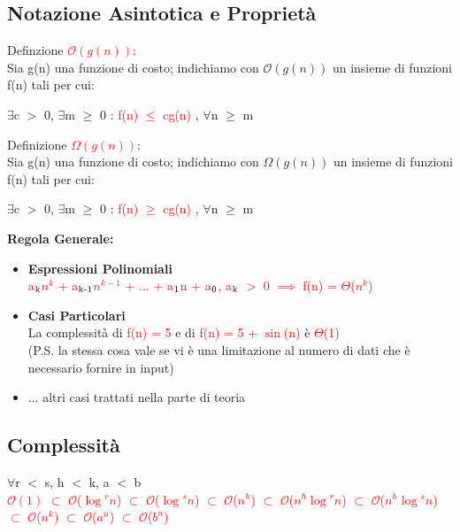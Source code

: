 \documentclass[../cheatSheetAlgoritmi.tex]{subfiles}
\begin{document}
\subsection{Notazione Asintotica e Proprietà}
Definzione \textcolor{red}{$\mathcal{O}(g(n))$}:\\
Sia g(n) una funzione di costo; indichiamo con $\mathcal{O}(g(n))$ un insieme di funzioni f(n) tali per cui:
\begin{center}
$\exists$c $>$ 0, $\exists$m $\geq$ 0 : \textcolor{red}{f(n) $\leq$ cg(n)} , $\forall$n $\geq$ m
\end{center}
Definizione \textcolor{red}{$\Omega(g(n))$}:\\
Sia g(n) una funzione di costo; indichiamo con $\Omega(g(n))$ un insieme di funzioni f(n) tali per cui:
\begin{center}
$\exists$c $>$ 0, $\exists$m $\geq$ 0 : \textcolor{red}{f(n) $\geq$ cg(n)} , $\forall$n $\geq$ m
\end{center}
\textbf{Regola Generale:}
\begin{itemize}
	\item \textbf{Espressioni Polinomiali}\\
		\textcolor{red}{a$\textsubscript{k}$$n^k$ + a$\textsubscript{k-1}$$n^{k-1}$ + ... + a$\textsubscript{1}$n + a$\textsubscript{0}$, a$\textsubscript{k}$ $>$ 0 $\implies$ f(n) = $\Theta$($n^k$)}
	\item \textbf{Casi Particolari}\\
		La complessità di \textcolor{red}{f(n) = 5} e di \textcolor{red}{f(n) = 5 + $\sin$(n)} è \textcolor{red}{ $\Theta$(1)}\\
		(P.S. la stessa cosa vale se vi è una limitazione al numero di dati che è necessario fornire in input)
	\item ... altri casi trattati nella parte di teoria
\end{itemize}

\subsection{Complessità}
$\forall$r $<$ s, h $<$ k, a $<$ b\\
\textcolor{red}{$\mathcal{O}(1)$ $\subset$ $\mathcal{O}$($\log$$^{r}n$) $\subset$ $\mathcal{O}$($\log$$^{s}n$) $\subset$ $\mathcal{O}$($n^{h}$) $\subset$ $\mathcal{O}$($n^{h}$$\log$$^{r}n$)  $\subset$ $\mathcal{O}$($n^{h}$$\log$$^{s}n$) $\subset$ $\mathcal{O}$($n^{k}$) $\subset$ $\mathcal{O}$($a^{n}$) $\subset$ $\mathcal{O}$($b^{n}$)}
\end{document}
